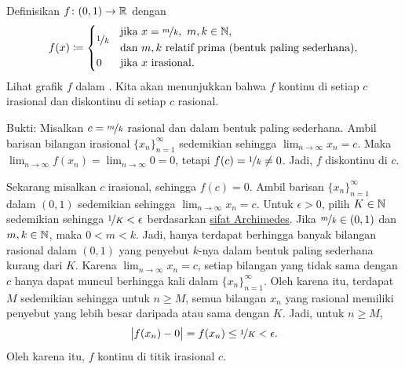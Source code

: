 \begin{example} \label{popcornfunction:example}
Definisikan $f \colon (0,1) \to {\mathbb{R}}$ dengan
\begin{equation*}
f(x) \coloneqq 
\begin{cases}
\nicefrac{1}{k} & \begin{aligned}
&\text{jika } x=\nicefrac{m}{k},\ m,k \in {\mathbb{N}}, \\ &\text{dan } m,k \text{ relatif prima (bentuk paling sederhana),}\end{aligned} \\
0 & \text{jika } x \text{ irasional.}
\end{cases}
\end{equation*}
Lihat grafik $f$
dalam .
Kita akan menunjukkan bahwa
$f$ kontinu di setiap $c$ irasional dan
diskontinu di setiap $c$ rasional.
\begin{myfigureht}
\caption{Grafik \label{popcornfig}}
\end{myfigureht}

Bukti:
Misalkan $c = \nicefrac{m}{k}$ rasional dan dalam bentuk paling sederhana.  Ambil barisan
bilangan irasional $\{ x_n \}_{n=1}^\infty$ sedemikian sehingga $\lim_{n\to\infty} x_n = c$.  Maka
$\lim_{n\to\infty} f(x_n) = \lim_{n\to\infty} 0 = 0$, tetapi $f(c) = \nicefrac{1}{k} \neq 0$.  Jadi, $f$
diskontinu di $c$.

Sekarang misalkan $c$ irasional, sehingga $f(c) = 0$.  Ambil barisan
$\{ x_n \}_{n=1}^\infty$ dalam $(0,1)$ sedemikian sehingga $\lim_{n\to\infty} x_n = c$.
Untuk $\epsilon > 0$, pilih $K \in {\mathbb{N}}$ sedemikian
sehingga $\nicefrac{1}{K} < \epsilon$
berdasarkan \hyperref[thm:arch:i]{sifat Archimedes}.
Jika $\nicefrac{m}{k} \in (0,1)$ dan $m,k \in {\mathbb{N}}$, maka $0 < m < k$.
Jadi, hanya terdapat berhingga banyak bilangan rasional dalam $(0,1)$
yang penyebut $k$-nya dalam bentuk paling sederhana kurang dari $K$.
Karena $\lim_{n\to\infty} x_n = c$, setiap bilangan yang tidak sama dengan $c$ hanya dapat muncul
berhingga kali dalam $\{ x_n \}_{n=1}^\infty$.
Oleh karena itu,
terdapat $M$ sedemikian sehingga untuk $n \geq M$, semua bilangan $x_n$
yang rasional
memiliki penyebut yang lebih besar daripada atau sama dengan $K$.  Jadi, untuk $n \geq M$,
\begin{equation*}
\bigl\lvert {f(x_n) - 0} \bigr\rvert = f(x_n) \leq \nicefrac{1}{K} < \epsilon .
\end{equation*}
Oleh karena itu, $f$ kontinu di titik irasional $c$.
\end{example}

